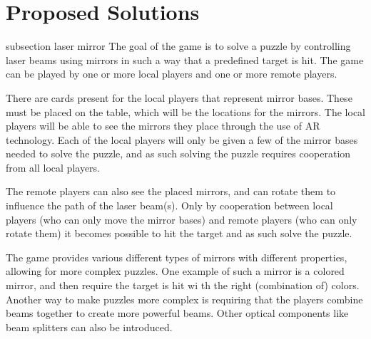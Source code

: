 \chapter{Proposed Solutions} \label{cha:solution}

{subsection laser mirror}
	The goal of the game is to solve a puzzle by controlling laser beams 
	using mirrors in such a way that a predefined target is hit. The game 
	can be played by one or more local players and one or more remote players.
	
	There are cards present for the local players that represent mirror 
	bases. These must be placed on the table, which will be the locations 
	for the mirrors. The local players will be able to see the mirrors they 
	place through the use of AR technology. Each of the local players will 
	only be given a few of the mirror bases needed to solve the puzzle, and 
	as such solving the puzzle requires cooperation from all local players.
	
	The remote players can also see the placed mirrors, and can rotate them 
	to influence the path of the laser beam(s). Only by cooperation between 
	local players (who can only move the mirror bases) and remote players 
	(who can only rotate them) it becomes possible to hit the target and as 
	such solve the puzzle.
	
	The game provides various different types of mirrors with different 
	properties, allowing for more complex puzzles. One example of such a 
	mirror is a colored mirror, and then require the target is hit wi                                                                                                                                                                                                                                                                                                                                                                                                                                                                                                                                                                                   th the 
	right (combination of) colors. Another way to make puzzles more complex 
	is requiring that the players combine beams together to create more 
	powerful beams. Other optical components like beam splitters can also be 
	introduced.
	
